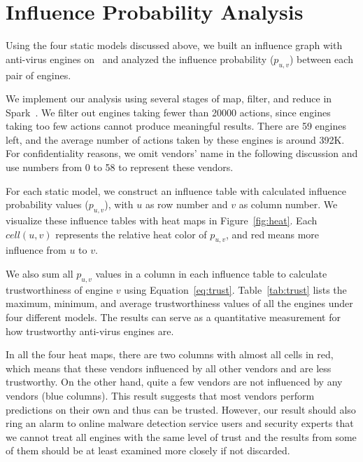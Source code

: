 

\section{Influence Probability Analysis}
\label{sec:influenceanalysis}

Using the four static models discussed above, we built an influence graph with anti-virus engines on \vt\ and analyzed 
the influence probability ($p_{u,v}$) between each pair of engines.

We implement our analysis using several stages of map, filter, and reduce in Spark~\cite{spark}. 
We filter out engines taking fewer than 20000 actions,
since engines taking too few actions cannot produce meaningful results.
There are 59 engines left,
and the average number of actions taken by these engines is around 392K.
For confidentiality reasons, we omit vendors' name in the following discussion
and use numbers from 0 to 58 to represent these vendors.


For each static model, 
we construct an influence table with calculated influence probability values ($p_{u,v}$), 
with $u$ as row number and $v$ as column number.
We visualize these influence tables with heat maps in Figure~\ref{fig:heat}. 
Each $cell(u, v)$ represents the relative heat color of $p_{u,v}$, 
and red means more influence from $u$ to $v$. 

We also sum all $p_{u,v}$ values in a column in each influence table 
to calculate trustworthiness of engine $v$ using Equation~\ref{eq:trust}. 
Table~\ref{tab:trust} lists the maximum, minimum, and average trustworthiness values of all the engines under four different models.
The results can serve as a quantitative measurement for how trustworthy anti-virus engines are. 

In all the four heat maps, there are two columns with almost all cells in red,
which means that these vendors influenced by all other vendors and are less trustworthy.
On the other hand, quite a few vendors are not influenced by any vendors (blue columns).
This result suggests that most vendors perform predictions on their own and thus can be trusted. 
However, our result should also ring an alarm to online malware detection service users and security experts that 
we cannot treat all engines with the same level of trust 
and the results from some of them should be at least examined more closely if not discarded.

